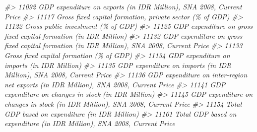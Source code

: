 \documentclass[
]{bxjsbook}
\newenvironment{Shaded}{\begin{snugshade}}{\end{snugshade}}
\newcommand{\CommentTok}[1]{\textcolor[rgb]{0.56,0.35,0.01}{\textit{#1}}}
\theoremstyle{definition}
\theoremstyle{definition}
\theoremstyle{definition}
\theoremstyle{definition}
\theoremstyle{remark}
\begin{document}
\begin{Shaded}
\begin{Highlighting}[]
\CommentTok{\#\textgreater{} 11092                                                                                                      GDP expenditure on exports (in IDR Million), SNA 2008, Current Price}
\CommentTok{\#\textgreater{} 11117                                                                                                                  Gross fixed capital formation, private sector (\% of GDP)}
\CommentTok{\#\textgreater{} 11122                                                                                                                                        Gross public investment (\% of GDP)}
\CommentTok{\#\textgreater{} 11125                                                                                                         GDP expenditure on gross fixed capital formation (in IDR Million)}
\CommentTok{\#\textgreater{} 11132                                                                                GDP expenditure on gross fixed capital formation (in IDR Million), SNA 2008, Current Price}
\CommentTok{\#\textgreater{} 11133                                                                                                                                  Gross fixed capital formation (\% of GDP)}
\CommentTok{\#\textgreater{} 11134                                                                                                                               GDP expenditure on imports (in IDR Million)}
\CommentTok{\#\textgreater{} 11135                                                                                                      GDP expenditure on imports (in IDR Million), SNA 2008, Current Price}
\CommentTok{\#\textgreater{} 11136                                                                                     GDP expenditure on inter{-}region net exports (in IDR Million), SNA 2008, Current Price}
\CommentTok{\#\textgreater{} 11141                                                                                                                      GDP expenditure on changes in stock (in IDR Million)}
\CommentTok{\#\textgreater{} 11145                                                                                             GDP expenditure on changes in stock (in IDR Million), SNA 2008, Current Price}
\CommentTok{\#\textgreater{} 11154                                                                                                                           Total GDP based on expenditure (in IDR Million)}
\CommentTok{\#\textgreater{} 11161                                                                                                  Total GDP based on expenditure (in IDR Million), SNA 2008, Current Price}

\end{Highlighting}
\end{Shaded}
\end{document}
